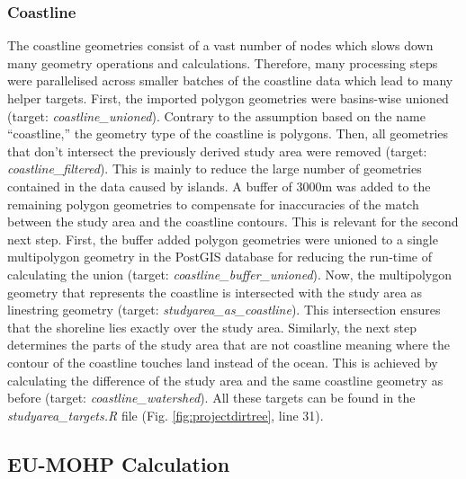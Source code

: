 \documentclass[fleqn,10pt]{wlscirep}
\begin{document}
\hypertarget{coastline}{%
\subsubsection*{Coastline}\label{coastline}}

The coastline geometries consist of a vast number of nodes which slows down many geometry operations and calculations. Therefore, many processing steps were parallelised across smaller batches of the coastline data which lead to many helper targets. First, the imported polygon geometries were basins-wise unioned (target: \emph{coastline\_unioned}). Contrary to the assumption based on the name ``coastline,'' the geometry type of the coastline is polygons. Then, all geometries that don't intersect the previously derived study area were removed (target: \emph{coastline\_filtered}). This is mainly to reduce the large number of geometries contained in the data caused by islands. A buffer of 3000m was added to the remaining polygon geometries to compensate for inaccuracies of the match between the study area and the coastline contours. This is relevant for the second next step. First, the buffer added polygon geometries were unioned to a single multipolygon geometry in the PostGIS database for reducing the run-time of calculating the union (target: \emph{coastline\_buffer\_unioned}). Now, the multipolygon geometry that represents the coastline is intersected with the study area as linestring geometry (target: \emph{studyarea\_as\_coastline}). This intersection ensures that the shoreline lies exactly over the study area. Similarly, the next step determines the parts of the study area that are not coastline meaning where the contour of the coastline touches land instead of the ocean. This is achieved by calculating the difference of the study area and the same coastline geometry as before (target: \emph{coastline\_watershed}). All these targets can be found in the \emph{studyarea\_targets.R} file (Fig. \ref{fig:projectdirtree}, line 31).

\hypertarget{eu-mohp-calculation}{%
\subsection*{EU-MOHP Calculation}\label{eu-mohp-calculation}}
\end{document}
